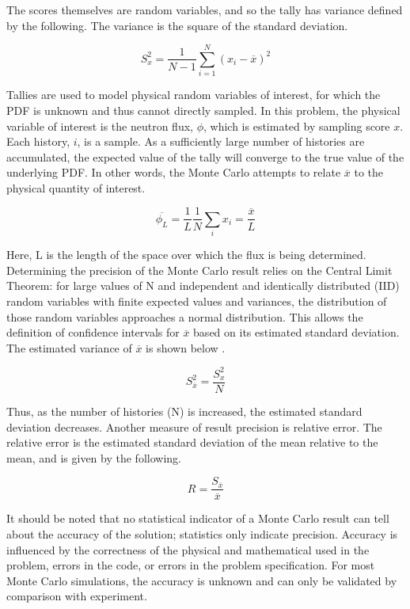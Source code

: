 \documentclass[11pt, oneside]{article}   	%
\newcommand*\mean[1]{\overline{#1}}				%
\begin{document}
The scores themselves are random variables, and so the tally has variance defined by the following. The variance is the square of the standard deviation.

\begin{equation}
S_{x}^{2} = \frac{1}{N-1}\sum_{i=1}^{N}(x_{i}-\mean{x})^{2}
\end{equation}

Tallies are used to model physical random variables of interest, for which the PDF is unknown and thus cannot directly sampled. In this problem, the physical variable of interest is the neutron flux, $\phi$, which is estimated by sampling score $x$. Each history, $i$, is a sample. As a sufficiently large number of histories are accumulated, the expected value of the tally will converge to the true value of the underlying PDF. In other words, the Monte Carlo attempts to relate $\mean{x}$ to the physical quantity of interest. 

\begin{equation}
\mean{\phi_L} = \frac{1}{L}\frac{1}{N}\sum_{i}x_{i} = \frac{\mean{x}}{L}
\end{equation}

Here, L is the length of the space over which the flux is being determined. Determining the precision of the Monte Carlo result relies on the Central Limit Theorem: for large values of N and independent and identically distributed (IID) random variables with finite expected values and variances, the distribution of those random variables approaches a normal distribution. This allows the definition of confidence intervals for $\mean{x}$ based on its estimated standard deviation. The estimated variance of $\mean{x}$ is shown below \cite{MCNP}.

\begin{equation}
S_{\mean{x}}^{2} = \frac{S_{x}^{2}}{N}
\end{equation}

Thus, as the number of histories (N) is increased, the estimated standard deviation decreases. Another measure of result precision is relative error. The relative error is the estimated standard deviation of the mean relative to the mean, and is given by the following.

\begin{equation}
R = \frac{S_{\mean{x}}}{\mean{x}}
\end{equation}

It should be noted that no statistical indicator of a Monte Carlo result can tell about the accuracy of the solution; statistics only indicate precision. Accuracy is influenced by the correctness of the physical and mathematical used in the problem, errors in the code, or errors in the problem specification. For most Monte Carlo simulations, the accuracy is unknown and can only be validated by comparison with experiment.
\end{document}
